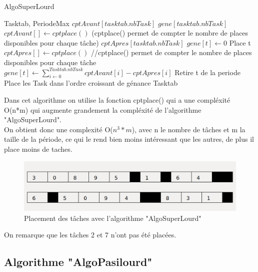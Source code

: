 \documentclass[11pt]{article}
\begin{document}
\begin{algorithm}
    \caption{AlgoSuperLourd}
    \begin{algorithmic}
    \REQUIRE Tasktab, PeriodeMax
    \STATE $cptAvant[tasktab.nbTask]$
    \STATE $gene[tasktab.nbTask]$
        \STATE $cptAvant[] \leftarrow cptplace()$ (cptplace() permet de compter le nombre de places disponibles pour chaque tâche)
        \STATE $cptApres[tasktab.nbTask]$
            \STATE $gene[t] \leftarrow 0$
                    \STATE Place t
                \ENDIF
            \ENDFOR
            \STATE $cptApres[] \leftarrow cptplace()$ //cptplace() permet de compter le nombre de places disponibles pour chaque tâche
            \STATE $gene[t] \leftarrow \sum\limits_{i\leftarrow0}^{Tasktab.nbTask} cptAvant[i] - cptApres[i]$
            \STATE Retire t de la periode
        \ENDFOR
        \STATE Place les Task dans l'ordre croissant de génance
    \ENDFOR
    \RETURN Tasktab
    \end{algorithmic}
\end{algorithm}

Dans cet algorithme on utilise la fonction cptplace() qui a une compléxité O(n*m) qui augmente grandement la compléxité de l'algorithme "AlgoSuperLourd".\\
On obtient donc une complexité O($n^3*m$), avec n le nombre de tâches et m la taille de la période, ce qui le rend bien moins intéressant que les autres, de plus il place moins de taches.

\begin{figure}[H]
    \center
    \includegraphics[scale = 0.35]{AlgoSuperLourd}
    \caption{Placement des tâches avec l'algorithme "AlgoSuperLourd"}
\end{figure}

\noindent On remarque que les tâches 2 et 7 n'ont pas été placées.

\subsection{Algorithme "AlgoPasilourd"}
\end{document}
